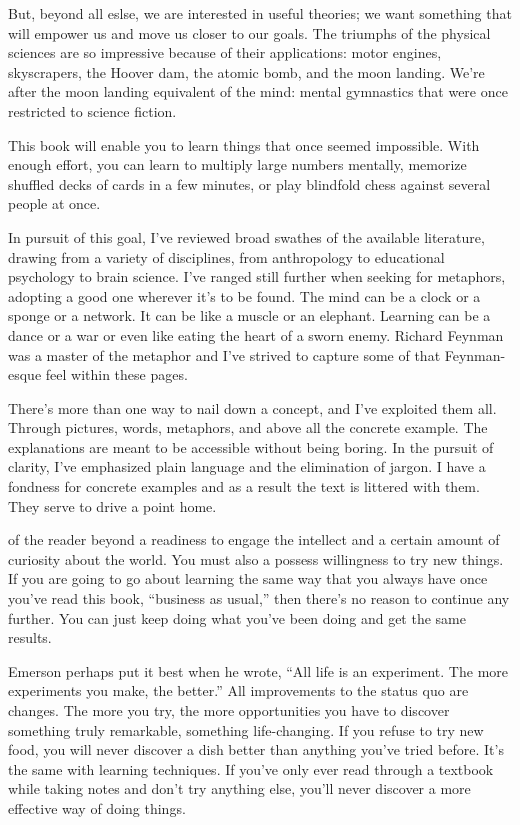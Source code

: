 But, beyond all eslse, we are interested in useful theories; we want something that will empower us and move us closer to our goals. The triumphs of the physical sciences are so impressive because of their applications: motor engines, skyscrapers, the Hoover dam, the atomic bomb, and the moon landing. We're after the moon landing equivalent of the mind: mental gymnastics that were once restricted to science fiction.

This book will enable you to learn things that once seemed impossible. With enough effort, you can learn to multiply large numbers mentally, memorize shuffled decks of cards in a few minutes, or play blindfold chess against several people at once. 

In pursuit of this goal, I've reviewed broad swathes of the available literature, drawing from a variety of disciplines, from anthropology to educational psychology to brain science. I've ranged still further when seeking for metaphors, adopting a good one wherever it's to be found. The mind can be a clock or a sponge or a network. It can be like a muscle or an elephant. Learning can be a dance or a war or even like eating the heart of a sworn enemy. Richard Feynman was a master of the metaphor and I've strived to capture some of that Feynman-esque feel within these pages.

There's more than one way to nail down a concept, and I've exploited them all. Through pictures, words, metaphors, and above all the concrete example. The explanations are meant to be accessible without being boring. In the pursuit of clarity, I've emphasized plain language and the elimination of jargon. I have a fondness for concrete examples and as a result the text is littered with them. They serve to drive a point home.

 of the reader beyond a readiness to engage the intellect and a certain amount of curiosity about the world. You must also a possess willingness to try new things. If you are going to go about learning the same way that you always have once you've read this book, ``business as usual,'' then there's no reason to continue any further. You can just keep doing what you've been doing and get the same results.

Emerson perhaps put it best when he wrote, ``All life is an experiment. The more experiments you make, the better.''\cite{emerson1984emerson} All improvements to the status quo are changes. The more you try, the more opportunities you have to discover something truly remarkable, something life-changing. If you refuse to try new food, you will never discover a dish better than anything you've tried before. It's the same with learning techniques. If you've only ever read through a textbook while taking notes and don't try anything else, you'll never discover a more effective way of doing things.

